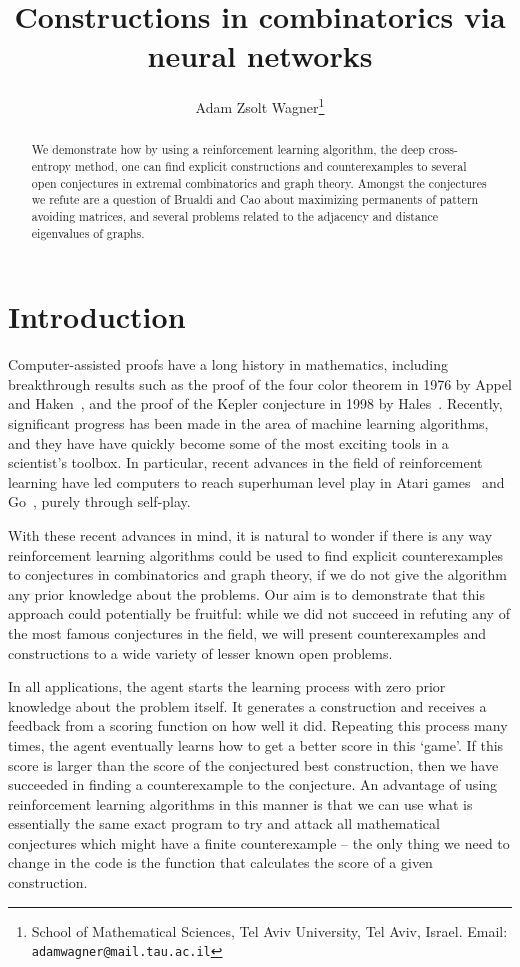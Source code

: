 \documentclass[11pt,english]{article}
\date{}
\title{Constructions in combinatorics via neural networks}
\author{
Adam Zsolt Wagner\thanks{School of Mathematical Sciences, Tel Aviv University, Tel Aviv, Israel. Email: \texttt{adamwagner@mail.tau.ac.il}}}
\theoremstyle{plain}
\theoremstyle{remark}
\begin{document}
\maketitle

\begin{abstract}
We demonstrate how by using a reinforcement learning algorithm, the deep cross-entropy method, one can find explicit constructions and counterexamples to several open conjectures in extremal combinatorics and graph theory. Amongst the conjectures we refute are a question of Brualdi and Cao about maximizing permanents of pattern avoiding matrices, and several problems related to the adjacency and distance eigenvalues of graphs. 
\end{abstract}




\section{Introduction}


Computer-assisted proofs have a long history in mathematics, including breakthrough results such as the proof of the four color theorem in 1976 by Appel and Haken~\cite{4ct}, and the proof of the Kepler conjecture in 1998 by Hales~\cite{kepler}. Recently, significant progress has been made in the area of machine learning algorithms, and they have have quickly become some of the most exciting tools in a scientist's toolbox. In particular, recent advances in the field of reinforcement learning have led computers to reach superhuman level play in Atari games~\cite{atari} and Go~\cite{go}, purely through self-play.


With these recent advances in mind, it is natural to wonder if there is any way reinforcement learning algorithms could be used to find explicit counterexamples to conjectures in combinatorics and graph theory, if we do not give the algorithm any prior knowledge about the problems. Our aim is to demonstrate that this approach could potentially be fruitful: while we did not succeed in refuting any of the most famous conjectures in the field, we will present counterexamples and constructions to a wide variety of lesser known open problems. 

In all applications, the agent starts the learning process with zero prior knowledge about the problem itself. It generates a construction and receives a feedback from a scoring function on how well it did. Repeating this process many times, the agent eventually learns how to get a better score in this `game'. If this score is larger than the score of the conjectured best construction, then we have succeeded in finding a counterexample to the conjecture. An advantage of using reinforcement learning algorithms in this manner is that we can use what is essentially the same exact program to try and attack all mathematical conjectures which might have a finite counterexample -- the only thing we need to change in the code is the function that calculates the score of a given construction.
\end{document}
